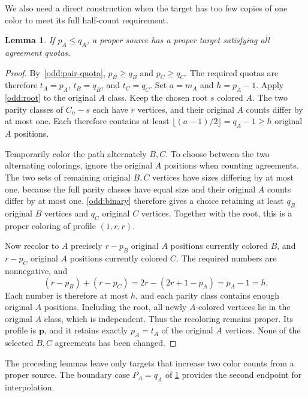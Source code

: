 \documentclass[10pt,a4paper]{amsart}
\numberwithin{equation}{section}
\newtheorem{lemma}[theorem]{Lemma}
\theoremstyle{definition}
\theoremstyle{remark}
\begin{document}
We also need a direct construction when the target has too few copies
of one color to meet its full half-count requirement.

\begin{lemma}\label{odd:lower}
If $p_A\le q_A$, a proper source has a proper target satisfying all
agreement quotas.
\end{lemma}
\begin{proof}
By~\eqref{odd:pair-quota}, $p_B\ge q_B$ and $p_C\ge q_C$.
The required quotas are therefore $t_A=p_A$, $t_B=q_B$, and $t_C=q_C$.
Set $a=m_A$ and $h=p_A-1$.
Apply \cref{odd:root} to the original $A$ class. Keep the chosen
root $s$ colored $A$. The two parity classes of $C_n-s$ each have
$r$ vertices, and their original $A$ counts differ by at most one.
Each therefore contains at least
$\lfloor(a-1)/2\rfloor=q_A-1\ge h$ original $A$ positions.

Temporarily color the path alternately $B,C$. To choose between the
two alternating colorings, ignore the original $A$ positions when counting
agreements. The two sets of remaining original $B,C$ vertices have
sizes differing by at most one, because the full parity classes have
equal size and their original $A$ counts differ by at most one.
\cref{odd:binary} therefore gives a choice retaining at
least $q_B$ original $B$ vertices and $q_C$ original $C$ vertices.
Together with the root, this is a proper coloring of profile $(1,r,r)$.

Now recolor to $A$ precisely $r-p_B$ original $A$ positions currently
colored $B$, and $r-p_C$ original $A$ positions currently colored $C$.
The required numbers are nonnegative, and
\[
(r-p_B)+(r-p_C)
=2r-(2r+1-p_A)=p_A-1=h.
\]
Each number is therefore at most $h$, and each parity class contains
enough original $A$ positions. Including the root, all newly
$A$-colored vertices lie in the original $A$ class, which is
independent. Thus the recoloring remains proper. Its profile is
$\mathbf p$, and it retains exactly $p_A=t_A$ of the original $A$ vertices.
None of the selected $B,C$ agreements has been changed.
\end{proof}

The preceding lemmas leave only targets that increase two color counts
from a proper source. The boundary case $P_A=q_A$ of \cref{odd:lower}
provides the second endpoint for interpolation.
\end{document}
